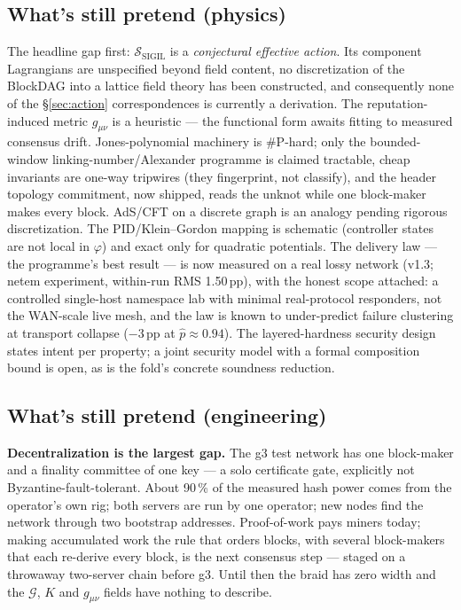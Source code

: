 \documentclass[10pt,a4paper]{article}
\newcommand{\SSIGIL}{\mathcal{S}_{\mathrm{SIGIL}}}
\begin{document}
\subsection{What's still pretend (physics)}

The headline gap first: $\SSIGIL$ is a \emph{conjectural effective action}. Its
component Lagrangians are unspecified beyond field content, no discretization of the
BlockDAG into a lattice field theory has been constructed, and consequently none of the
\S\ref{sec:action} correspondences is currently a derivation. The reputation-induced
metric $g_{\mu\nu}$ is a heuristic — the functional form awaits fitting to measured
consensus drift. Jones-polynomial machinery is \#P-hard; only the bounded-window
linking-number/Alexander programme is claimed tractable, cheap invariants are one-way
tripwires (they fingerprint, not classify), and the header topology commitment, now
shipped, reads the unknot while one block-maker makes every block. AdS/CFT on a discrete graph is an analogy pending rigorous
discretization. The PID/Klein–Gordon mapping is schematic (controller states are not
local in $\varphi$) and exact only for quadratic potentials. The delivery law — the
programme's best result — is now measured on a real lossy network (v1.3; netem
experiment, within-run RMS 1.50\,pp), with the honest scope attached: a controlled
single-host namespace lab with minimal real-protocol responders, not the WAN-scale
live mesh, and the law is known to under-predict failure clustering at transport
collapse ($-3$\,pp at $\hat p\approx0.94$). The layered-hardness
security design states intent per property; a joint security model with a formal
composition bound is open, as is the fold's concrete soundness reduction.

\subsection{What's still pretend (engineering)}

\textbf{Decentralization is the largest gap.} The g3 test network has one block-maker and a finality committee of one
key --- a solo certificate gate, explicitly not Byzantine-fault-tolerant. About 90\,\% of the measured hash power comes
from the operator's own rig; both servers are run by one operator; new nodes find the network through two bootstrap
addresses. Proof-of-work pays miners today; making accumulated work the rule that orders blocks, with several
block-makers that each re-derive every block, is the next consensus step --- staged on a throwaway two-server chain
before g3. Until then the braid has zero width and the $\mathcal{G}$, $K$ and $g_{\mu\nu}$ fields have nothing to describe.
\end{document}
